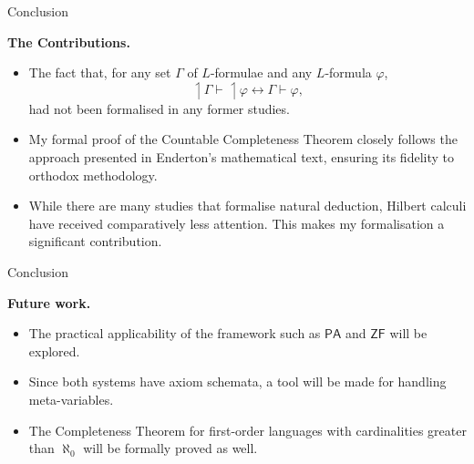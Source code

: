 \documentclass[serif,table,10pt]{beamer}
\newcommand{\0}{\texttt{0}}
\newcommand{\1}{\texttt{1}}
\newcommand{\embed}[1]{{\upharpoonleft} {#1}}
\begin{document}
\begin{frame}{Conclusion}

    \textbf{The Contributions.}

    \begin{itemize}
        \item The fact that, for any set $\Gamma$ of $L$-formulae and any $L$-formula $\varphi$, \[ \embed{\Gamma} \vdash \embed{\varphi} \leftrightarrow \Gamma \vdash \varphi , \] had not been formalised in any former studies.
        \item My formal proof of the Countable Completeness Theorem closely follows the approach presented in Enderton's mathematical text, ensuring its fidelity to orthodox methodology.
        \item While there are many studies that formalise natural deduction, Hilbert calculi have received comparatively less attention. This makes my formalisation a significant contribution.
    \end{itemize}

\end{frame}

\begin{frame}{Conclusion}

    \textbf{Future work.}

    \begin{itemize}
        \item The practical applicability of the framework such as $\mathsf{PA}$ and $\mathsf{ZF}$ will be explored.
        \item Since both systems have axiom schemata, a tool will be made for handling meta-variables.
        \item The Completeness Theorem for first-order languages with cardinalities greater than $\aleph_0$ will be formally proved as well.
    \end{itemize}

\end{frame}
\end{document}
